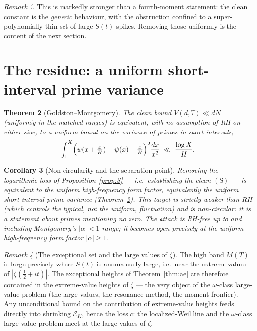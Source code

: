 \documentclass[11pt]{amsart}
\newtheorem{theorem}{Theorem}[section]
\newtheorem{corollary}[theorem]{Corollary}
\theoremstyle{definition}
\theoremstyle{remark}
\newtheorem{remark}[theorem]{Remark}
\begin{document}
\begin{remark}
This is markedly stronger than a fourth-moment statement: the clean constant is
the \emph{generic} behaviour, with the obstruction confined to a
super-polynomially thin set of large-$S(t)$ spikes. Removing those uniformly is
the content of the next section.
\end{remark}

\section{The residue: a uniform short-interval prime variance}
\begin{theorem}[Goldston--Montgomery]\label{thm:gm}
The clean bound $V(d,T)\ll dN$ (uniformly in the matched ranges) is equivalent,
with no assumption of RH on either side, to a uniform bound on the variance of
primes in short intervals,
\[
\int_1^X\Bigl(\psi(x+\tfrac xH)-\psi(x)-\tfrac xH\Bigr)^2\frac{dx}{x^2}\ \ll\ \frac{\log X}{H}.
\]
\end{theorem}

\begin{corollary}[Non-circularity and the separation point]\label{cor:noncirc}
Removing the logarithmic loss of Proposition~\ref{prop:S} --- i.e.\ establishing
the clean $(\mathrm S)$ --- is equivalent to the uniform high-frequency form
factor, equivalently the uniform short-interval prime variance
(Theorem~\ref{thm:gm}). This target is strictly weaker than RH (which controls the
typical, not the uniform, fluctuation) and is non-circular: it is a statement
about primes mentioning no zero. The attack is RH-free up to and including
Montgomery's $|\alpha|<1$ range; it becomes open precisely at the uniform
high-frequency form factor $|\alpha|\ge1$.
\end{corollary}

\begin{remark}[The exceptional set and the large values of $\zeta$]
The high band $M(T)$ is large precisely where $S(t)$ is anomalously large, i.e.\
near the extreme values of $|\zeta(\tfrac12+it)|$. The exceptional heights of
Theorem~\ref{thm:ae} are therefore contained in the extreme-value heights of
$\zeta$ --- the very object of the $\omega$-class large-value problem (the
large values, the resonance method, the moment frontier). Any unconditional bound
on the contribution of extreme-value heights feeds directly into shrinking
$\mathcal E_K$, hence the loss $c$: the localized-Weil line and the $\omega$-class large-value problem meet at the large values of $\zeta$.
\end{remark}
\end{document}
